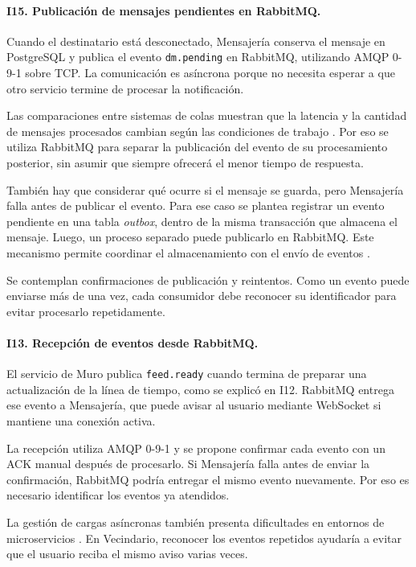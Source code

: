 \documentclass[12pt,a4paper]{article}
\begin{document}
\paragraph{I15. Publicación de mensajes pendientes en RabbitMQ.}

Cuando el destinatario está desconectado, Mensajería conserva el mensaje
en PostgreSQL y publica el evento \texttt{dm.pending} en RabbitMQ,
utilizando AMQP 0-9-1 sobre TCP. La comunicación es asíncrona porque
no necesita esperar a que otro servicio termine de procesar la
notificación.

Las comparaciones entre sistemas de colas muestran que la latencia
y la cantidad de mensajes procesados cambian según las condiciones
de trabajo \cite{maharjan2023queues}. Por eso se utiliza RabbitMQ
para separar la publicación del evento de su procesamiento posterior,
sin asumir que siempre ofrecerá el menor tiempo de respuesta.

También hay que considerar qué ocurre si el mensaje se guarda, pero
Mensajería falla antes de publicar el evento. Para ese caso se plantea
registrar un evento pendiente en una tabla \textit{outbox}, dentro de
la misma transacción que almacena el mensaje. Luego, un proceso
separado puede publicarlo en RabbitMQ. Este mecanismo permite
coordinar el almacenamiento con el envío de eventos
\cite{gupta2025outbox}.

Se contemplan confirmaciones de publicación y reintentos. Como un
evento puede enviarse más de una vez, cada consumidor debe reconocer
su identificador para evitar procesarlo repetidamente.

\paragraph{I13. Recepción de eventos desde RabbitMQ.}

El servicio de Muro publica \texttt{feed.ready} cuando termina de
preparar una actualización de la línea de tiempo, como se explicó
en I12. RabbitMQ entrega ese evento a Mensajería, que puede avisar
al usuario mediante WebSocket si mantiene una conexión activa.

La recepción utiliza AMQP 0-9-1 y se propone confirmar cada evento
con un ACK manual después de procesarlo. Si Mensajería falla antes
de enviar la confirmación, RabbitMQ podría entregar el mismo evento
nuevamente. Por eso es necesario identificar los eventos ya atendidos.

La gestión de cargas asíncronas también presenta dificultades en
entornos de microservicios \cite{batista2024async}. En Vecindario,
reconocer los eventos repetidos ayudaría a evitar que el usuario
reciba el mismo aviso varias veces.
\end{document}
